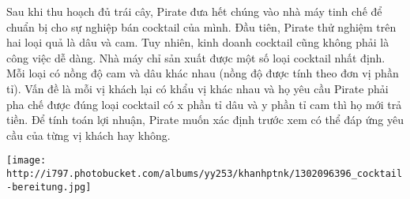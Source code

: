 Sau khi thu hoạch đủ trái cây, Pirate đưa hết chúng vào nhà máy tinh chế để chuẩn bị cho sự nghiệp bán cocktail của mình. Đầu tiên, Pirate thử nghiệm trên hai loại quả là dâu và cam. Tuy nhiên, kinh doanh cocktail cũng không phải là công việc dễ dàng. Nhà máy chỉ sản xuất được một số loại cocktail nhất định. Mỗi loại có nồng độ cam và dâu khác nhau (nồng độ được tính theo đơn vị phần tỉ). Vấn đề là mỗi vị khách lại có khẩu vị khác nhau và họ yêu cầu Pirate phải pha chế được đúng loại cocktail có x phần tỉ dâu và y phần tỉ cam thì họ mới trả tiền. Để tính toán lợi nhuận, Pirate muốn xác định trước xem có thể đáp ứng yêu cầu của từng vị khách hay không.  


\texttt{[image: http://i797.photobucket.com/albums/yy253/khanhptnk/1302096396\_cocktail-bereitung.jpg]}